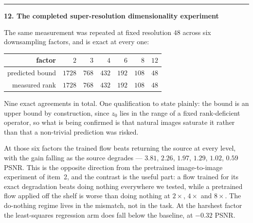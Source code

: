 \documentclass[11pt]{article}
\newenvironment{item12}[1]{%
  \par\medskip\noindent\rule{\textwidth}{0.7pt}\par\nobreak\smallskip
  \noindent\textbf{\large #1}\par\nobreak\smallskip
}{\par\medskip}
\begin{document}
\begin{item12}{12. The completed super-resolution dimensionality experiment}
The same measurement was repeated at fixed resolution $48$ across six downsampling factors, and
is exact at every one:

\begin{center}
\small
\begin{tabular}{@{}rrrrrrr@{}}
\toprule
factor & $2$ & $3$ & $4$ & $6$ & $8$ & $12$\\
\midrule
predicted bound & $1728$ & $768$ & $432$ & $192$ & $108$ & $48$\\
measured rank   & $1728$ & $768$ & $432$ & $192$ & $108$ & $48$\\
\bottomrule
\end{tabular}
\end{center}

Nine exact agreements in total. One qualification to state plainly: the bound is an upper bound
by construction, since $z_0$ lies in the range of a fixed rank-deficient operator, so what is
being confirmed is that natural images saturate it rather than that a non-trivial prediction was
risked.

At those six factors the trained flow beats returning the source at every level, with the gain
falling as the source degrades --- $3.81$, $2.26$, $1.97$, $1.29$, $1.02$, $0.59$ PSNR. This is
the opposite direction from the pretrained image-to-image experiment of item~2, and the contrast
is the useful part: a flow trained for its exact degradation beats doing nothing everywhere we
tested, while a pretrained flow applied off the shelf is worse than doing nothing at $2\times$,
$4\times$ and $8\times$. The do-nothing regime lives in the mismatch, not in the task. At the
harshest factor the least-squares regression arm does fall below the baseline, at $-0.32$ PSNR.
\end{item12}
\end{document}

